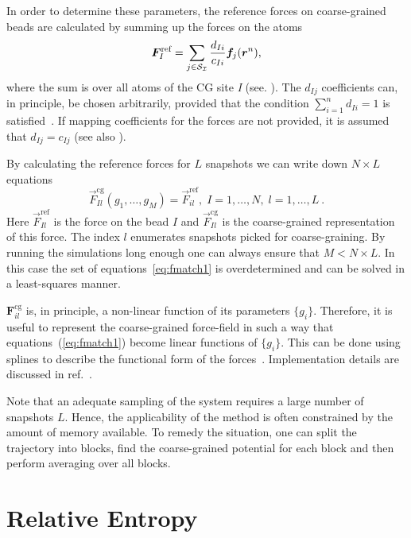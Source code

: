 In order to determine these parameters, the reference forces on coarse-grained beads are calculated by summing up the forces on the atoms
\begin{equation}
  {\vec F}_I^\text{ref} = \sum_{j \in {\cal S_I}} \frac{d_{Ii}}{c_{Ii}} {\vec f}_j({\vec r^n}),
  \label{eq:force_mapping}
\end{equation}
where the sum is over all atoms of the CG site {\it I} (see. ).
The $d_{Ij}$ coefficients can, in principle, be chosen arbitrarily, provided that the condition $ \sum_{i=1}^{n}d_{Ii}=1$ is satisfied~\cite{Noid:2008.1}. If mapping coefficients for the forces are not provided, it is assumed that $d_{Ij} = c_{Ij}$ (see also ).

By calculating the reference forces for $L$ snapshots we can write down $N \times L$ equations
%
\begin{equation}
  {\vec F}_{Il}^\text{cg}(g_1, \dots ,g_M)=\vec F_{il}^\text{ref},\;
  I=1,\dots,N,\; l=1,\dots,L~.
  \label{eq:fmatch1}
\end{equation}
%
Here ${\vec F}_{Il}^\text{ref}$ is the force on the bead $I$ and ${\vec F}_{Il}^\text{cg} $ is the coarse-grained representation of this force. The index $l$ enumerates snapshots picked for coarse-graining. By running the simulations long enough one can always ensure that $M < N \times L$. In this case the set of equations~\ref{eq:fmatch1} is overdetermined and can be solved in a least-squares manner.

${\bm F}_{il}^\text{cg}$ is, in principle, a non-linear function of its parameters $\{g_i\}$. Therefore, it is useful to represent the coarse-grained force-field in such a way that equations~(\ref{eq:fmatch1}) become linear functions of $\{g_i\}$. This can be done using splines to describe the functional form of the forces~\cite{Izvekov:2005}. Implementation details are discussed in ref.~\cite{Ruehle:2009.a}.

Note that an adequate sampling of the system requires a large number of snapshots $L$. Hence, the applicability of the method is often constrained by the amount of memory available. To remedy the situation, one can split the trajectory into blocks, find the coarse-grained potential for each block and then perform averaging over all blocks.

\section{Relative Entropy}
\label{sec:re}

